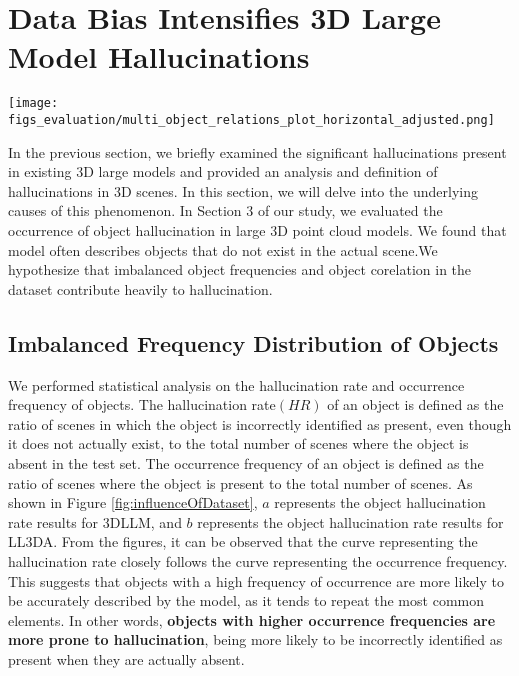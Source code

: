 \section{Data Bias Intensifies 3D Large Model Hallucinations}\label{sec::system}
\begin{figure*}[htb] 
\centering
\texttt{[image: figs\_evaluation/multi\_object\_relations\_plot\_horizontal\_adjusted.png]} %
     \caption{(1): The relationship between object hallucination rates in 3DLLM and LL3DA and object occurrence frequencies in the dataset is shown in figures a and b.(2): The relationship between strong object correlations and object hallucination rates are shown in figure c.}
     \label{fig:influenceOfDataset}
\end{figure*}
In the previous section, we briefly examined the significant hallucinations present in existing 3D large models and provided an analysis and definition of hallucinations in 3D scenes. In this section, we will delve into the underlying causes of this phenomenon.
In Section 3 of our study, we evaluated the occurrence of object hallucination in  large 3D point cloud models. We found that  model often describes objects that do not exist in the actual scene.We hypothesize that imbalanced object frequencies and object corelation in the dataset contribute heavily to hallucination. 
\subsection{Imbalanced Frequency Distribution of Objects}
We performed statistical analysis on the hallucination rate and occurrence frequency of objects. The hallucination rate$(HR)$ of an object is defined as the ratio of scenes in which the object is incorrectly identified as present, even though it does not actually exist, to the total number of scenes where the object is absent in the test set. The occurrence frequency of an object is defined as the ratio of scenes where the object is present to the total number of scenes. As shown in Figure \ref{fig:influenceOfDataset}, $a$ represents the object hallucination rate results for 3DLLM, and $b$ represents the object hallucination rate results for LL3DA. From the figures, it can be observed that the curve representing the hallucination rate closely follows the curve representing the occurrence frequency. This suggests that objects with a high frequency of occurrence are more likely to be accurately described by the model, as it tends to repeat the most common elements. In other words, \textbf{objects with higher occurrence frequencies are more prone to hallucination}, being more likely to be incorrectly identified as present when they are actually absent.

